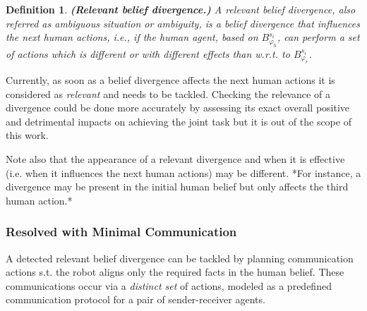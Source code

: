 \documentclass[letterpaper]{article} %
\newtheorem{definition}{Definition}
\begin{document}
\begin{definition} \label{def:reldiv}
\textbf{(Relevant belief divergence.)} A relevant belief divergence, also referred as ambiguous situation or ambiguity, is a belief divergence that influences the next human actions, i.e., if the human agent, based on $\mathit{B}_{\varphi_h}^{s_i}$, can perform a set of actions which is different or with different effects than w.r.t. to $\mathit{B}_{\varphi_r}^{s_i}$.
\end{definition}

Currently, as soon as a belief divergence affects the next human actions it is considered as \textit{relevant} and needs to be tackled. Checking the relevance of a divergence could be done more accurately by assessing its exact overall positive and detrimental impacts on achieving the joint task but it is out of the scope of this work. 

Note also that the appearance of a relevant divergence and when it is effective (i.e. when it influences the next human actions) may be different. 
*For instance, a divergence may be present in the initial human belief but only affects the third human action.*

\subsubsection{Resolved with Minimal Communication}





A detected relevant belief divergence can be tackled by planning communication actions s.t. the robot aligns only the required facts in the human belief.
These communications occur via a \textit{distinct set} of actions, modeled as a predefined communication protocol for a pair of sender-receiver agents.
\end{document}
